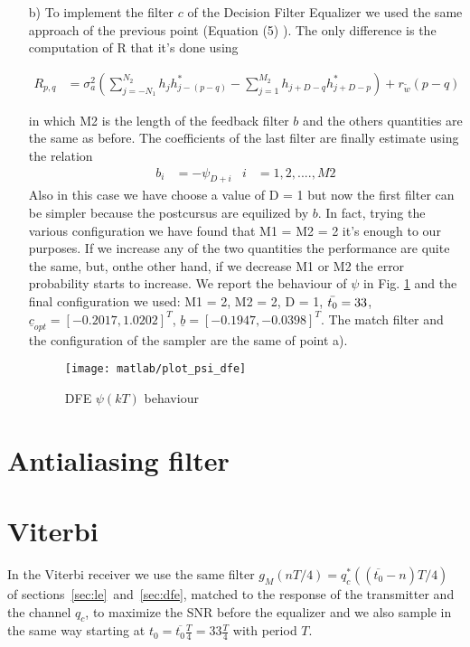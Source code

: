 \documentclass[a4paper,oneside]{article}
\renewcommand{\vec}[1]{\underline{#1}}
\begin{document}
\begin{itemize}
\item[b)] To implement the filter $c$ of the Decision Filter Equalizer we used the same approach of the previous point (Equation (5) ). The only difference is the computation of R that it's done using

\begin{align}
 R_{p,q} &= \sigma^2_a\left( \sum_{j=-N_1}^{N_2}h_jh^*_{j-(p-q)} - \sum_{j=1}^{M_2}h_{j+D-q}h^*_{j+D-p} \right) + r_{\tilde{w}}(p-q)
\end{align}

in which M2 is the length of the feedback filter $b$ and the others quantities are the same as before.
The coefficients of the last filter are finally estimate using the relation 
\begin{align}
b_i &= - \psi_{D+i}&  i &= 1,2,....,M2
\end{align}
Also in this case we have choose a value of D = 1 but now the first filter can be simpler because the postcursus are equilized by $b$. In fact, trying the various configuration we have found that M1 = M2 = 2 it's enough to our purposes. If we increase any of the two quantities the performance are quite the same, but, onthe other hand, if we decrease M1 or M2 the error probability starts to increase. We report the behaviour of $\psi$ in Fig. \ref{plot:psi_dfe_1} and the final configuration we used:
M1 = 2, M2 = 2, D = 1, $\Bar{t_0} = 33$, $\vec{c}_{opt} = [-0.2017, 1.0202]^T$, $\vec{b} = [-0.1947, -0.0398]^T$. The match filter and the configuration of the sampler are the same of point a).

\begin{figure}[h]
  \centering
  \texttt{[image: matlab/plot\_psi\_dfe]}
  \caption{DFE $\psi(kT)$ behaviour}
  \label{plot:psi_dfe_1}
\end{figure}


\end{itemize}




\section{Antialiasing filter}



\section{Viterbi}
\label{sec:viterbi}
In the Viterbi receiver we use the same filter $g_M(nT/4) = q_c^*((\overline{t_0} - n)T/4)$ of
sections~\ref{sec:le}~and~\ref{sec:dfe}, matched to the response of
the transmitter and the channel $q_c$, {\color{red} to maximize the
  SNR before the equalizer} and we also sample in the same way
starting at $t_0 = \overline{t_0}\frac{T}{4} = 33\frac{T}{4}$ with
period $T$.
\end{document}
